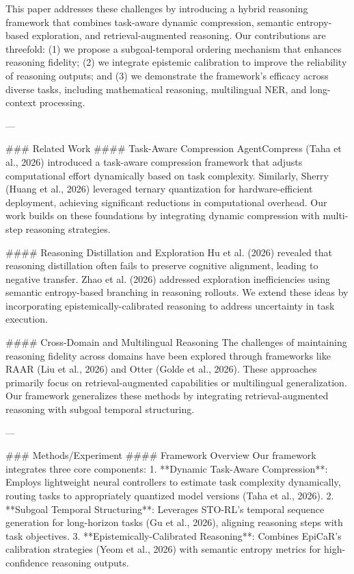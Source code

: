 This paper addresses these challenges by introducing a hybrid reasoning framework that combines task-aware dynamic compression, semantic entropy-based exploration, and retrieval-augmented reasoning. Our contributions are threefold: (1) we propose a subgoal-temporal ordering mechanism that enhances reasoning fidelity; (2) we integrate epistemic calibration to improve the reliability of reasoning outputs; and (3) we demonstrate the framework's efficacy across diverse tasks, including mathematical reasoning, multilingual NER, and long-context processing. 

---

### Related Work
#### Task-Aware Compression
AgentCompress (Taha et al., 2026) introduced a task-aware compression framework that adjusts computational effort dynamically based on task complexity. Similarly, Sherry (Huang et al., 2026) leveraged ternary quantization for hardware-efficient deployment, achieving significant reductions in computational overhead. Our work builds on these foundations by integrating dynamic compression with multi-step reasoning strategies.

#### Reasoning Distillation and Exploration
Hu et al. (2026) revealed that reasoning distillation often fails to preserve cognitive alignment, leading to negative transfer. Zhao et al. (2026) addressed exploration inefficiencies using semantic entropy-based branching in reasoning rollouts. We extend these ideas by incorporating epistemically-calibrated reasoning to address uncertainty in task execution.

#### Cross-Domain and Multilingual Reasoning
The challenges of maintaining reasoning fidelity across domains have been explored through frameworks like RAAR (Liu et al., 2026) and Otter (Golde et al., 2026). These approaches primarily focus on retrieval-augmented capabilities or multilingual generalization. Our framework generalizes these methods by integrating retrieval-augmented reasoning with subgoal temporal structuring.

---

### Methods/Experiment
#### Framework Overview
Our framework integrates three core components:
1. **Dynamic Task-Aware Compression**: Employs lightweight neural controllers to estimate task complexity dynamically, routing tasks to appropriately quantized model versions (Taha et al., 2026).
2. **Subgoal Temporal Structuring**: Leverages STO-RL's temporal sequence generation for long-horizon tasks (Gu et al., 2026), aligning reasoning steps with task objectives.
3. **Epistemically-Calibrated Reasoning**: Combines EpiCaR's calibration strategies (Yeom et al., 2026) with semantic entropy metrics for high-confidence reasoning outputs.

